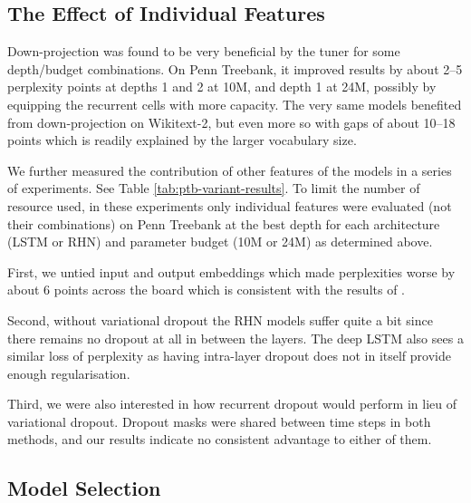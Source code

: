 \documentclass[letter]{article} \usepackage{iclr2018_conference,times}
\newcommand{\ptb}{Penn Treebank\xspace}
\newcommand{\wikitexttwo}{Wikitext-2\xspace}
\begin{document}
\subsection{The Effect of Individual Features}

Down-projection was found to be very beneficial by the tuner for some
depth/budget combinations. On \ptb, it improved results by about 2--5
perplexity points at depths 1 and 2 at 10M, and depth 1 at 24M,
possibly by equipping the recurrent cells with more capacity. The very
same models benefited from down-projection on \wikitexttwo, but even
more so with gaps of about 10--18 points which is readily explained by
the larger vocabulary size.

We further measured the contribution of other features of the models
in a series of experiments. See Table \ref{tab:ptb-variant-results}.
To limit the number of resource used, in these experiments only
individual features were evaluated (not their combinations) on \ptb at
the best depth for each architecture (LSTM or RHN) and parameter
budget (10M or 24M) as determined above.

First, we untied input and output embeddings which made perplexities
worse by about 6 points across the board which is consistent with the
results of \citet{DBLP:journals/corr/InanKS16}.

Second, without variational dropout the RHN models suffer quite a bit
since there remains no dropout at all in between the layers. The deep
LSTM also sees a similar loss of perplexity as having intra-layer
dropout does not in itself provide enough regularisation.

Third, we were also interested in how recurrent dropout
\citep{DBLP:journals/corr/SemeniutaSB16} would perform in lieu of
variational dropout. Dropout masks were shared between time steps in
both methods, and our results indicate no consistent advantage to
either of them.

\subsection{Model Selection}
\end{document}
